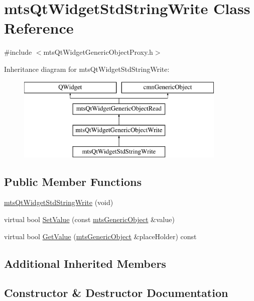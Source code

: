 \hypertarget{classmts_qt_widget_std_string_write}{}\section{mts\+Qt\+Widget\+Std\+String\+Write Class Reference}
\label{classmts_qt_widget_std_string_write}


{\ttfamily \#include $<$mts\+Qt\+Widget\+Generic\+Object\+Proxy.\+h$>$}

Inheritance diagram for mts\+Qt\+Widget\+Std\+String\+Write\+:\begin{figure}[H]
\begin{center}
\leavevmode
\includegraphics[height=4.000000cm]{d7/d2f/classmts_qt_widget_std_string_write}
\end{center}
\end{figure}
\subsection*{Public Member Functions}
\begin{DoxyCompactItemize}
\item 
\hyperlink{classmts_qt_widget_std_string_write_a08694ce6cc3a9608bc84848c88c38b51}{mts\+Qt\+Widget\+Std\+String\+Write} (void)
\item 
virtual bool \hyperlink{classmts_qt_widget_std_string_write_a2bb0e3bd9ead0c8d1f45c4d850866c98}{Set\+Value} (const \hyperlink{classmts_generic_object}{mts\+Generic\+Object} \&value)
\item 
virtual bool \hyperlink{classmts_qt_widget_std_string_write_a46abbb09b0a1aa4add916bec80564255}{Get\+Value} (\hyperlink{classmts_generic_object}{mts\+Generic\+Object} \&place\+Holder) const 
\end{DoxyCompactItemize}
\subsection*{Additional Inherited Members}


\subsection{Constructor \& Destructor Documentation}
\hypertarget{classmts_qt_widget_std_string_write_a08694ce6cc3a9608bc84848c88c38b51}{}
